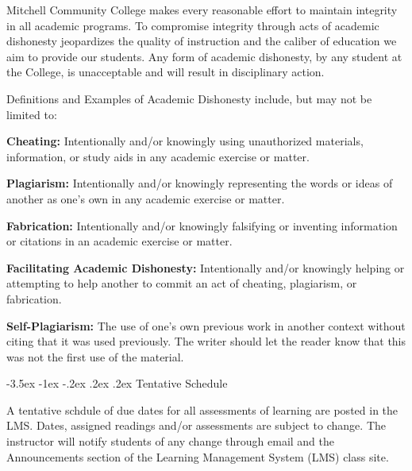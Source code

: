 \documentclass{article}
\makeatletter
\renewcommand\section{\@startsection{section}{1}{0pt}%
  {-3.5ex \@plus -1ex \@minus -.2ex}%
  {.2ex \@plus.2ex}%
  {\normalfont\Large\bfseries}} %
\makeatother
\begin{document}
Mitchell Community College makes every reasonable effort to maintain integrity in all academic programs. To compromise integrity through acts of academic dishonesty jeopardizes the quality of instruction and the caliber of education we aim to provide our students.  Any form of academic dishonesty, by any student at the College, is unacceptable and will result in disciplinary action.

Definitions and Examples of Academic Dishonesty include, but may not be limited to:

\textbf{Cheating:} Intentionally and/or knowingly using unauthorized materials, information, or study aids in any academic exercise or matter.

\textbf{Plagiarism:} Intentionally and/or knowingly representing the words or ideas of another as one's own in any academic exercise or matter.

\textbf{Fabrication:} Intentionally and/or knowingly falsifying or inventing information or citations in an academic exercise or matter.

\textbf{Facilitating Academic Dishonesty:} Intentionally and/or knowingly helping or attempting to help another to commit an act of cheating, plagiarism, or fabrication.

\textbf{Self-Plagiarism:} The use of one's own previous work in another context without citing that it was used previously. The writer should let the reader know that this was not the first use of the material.

\section{Tentative Schedule}

A tentative schdule of due dates for all assessments of learning are posted in the LMS. Dates, assigned readings and/or assessments are subject to change. The instructor will notify students of any change through email and the Announcements section of the Learning Management System (LMS) class site.
\end{document}
